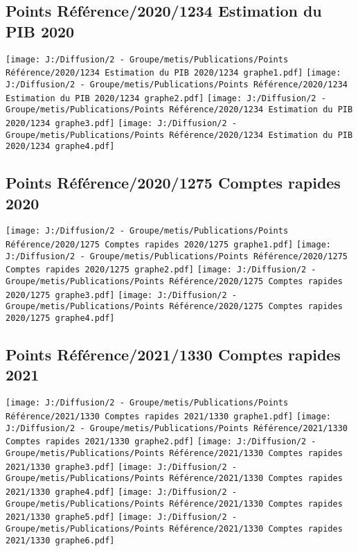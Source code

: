\documentclass[
]{article}
\begin{document}
\hypertarget{points-ruxe9fuxe9rence20201234-estimation-du-pib-2020}{%
\subsection{Points Référence/2020/1234 Estimation du PIB
2020}\label{points-ruxe9fuxe9rence20201234-estimation-du-pib-2020}}

\texttt{[image: J:/Diffusion/2 - Groupe/metis/Publications/Points Référence/2020/1234 Estimation du PIB 2020/1234 graphe1.pdf]}
\texttt{[image: J:/Diffusion/2 - Groupe/metis/Publications/Points Référence/2020/1234 Estimation du PIB 2020/1234 graphe2.pdf]}
\texttt{[image: J:/Diffusion/2 - Groupe/metis/Publications/Points Référence/2020/1234 Estimation du PIB 2020/1234 graphe3.pdf]}
\texttt{[image: J:/Diffusion/2 - Groupe/metis/Publications/Points Référence/2020/1234 Estimation du PIB 2020/1234 graphe4.pdf]}

\hypertarget{points-ruxe9fuxe9rence20201275-comptes-rapides-2020}{%
\subsection{Points Référence/2020/1275 Comptes rapides
2020}\label{points-ruxe9fuxe9rence20201275-comptes-rapides-2020}}

\texttt{[image: J:/Diffusion/2 - Groupe/metis/Publications/Points Référence/2020/1275 Comptes rapides 2020/1275 graphe1.pdf]}
\texttt{[image: J:/Diffusion/2 - Groupe/metis/Publications/Points Référence/2020/1275 Comptes rapides 2020/1275 graphe2.pdf]}
\texttt{[image: J:/Diffusion/2 - Groupe/metis/Publications/Points Référence/2020/1275 Comptes rapides 2020/1275 graphe3.pdf]}
\texttt{[image: J:/Diffusion/2 - Groupe/metis/Publications/Points Référence/2020/1275 Comptes rapides 2020/1275 graphe4.pdf]}

\hypertarget{points-ruxe9fuxe9rence20211330-comptes-rapides-2021}{%
\subsection{Points Référence/2021/1330 Comptes rapides
2021}\label{points-ruxe9fuxe9rence20211330-comptes-rapides-2021}}

\texttt{[image: J:/Diffusion/2 - Groupe/metis/Publications/Points Référence/2021/1330 Comptes rapides 2021/1330 graphe1.pdf]}
\texttt{[image: J:/Diffusion/2 - Groupe/metis/Publications/Points Référence/2021/1330 Comptes rapides 2021/1330 graphe2.pdf]}
\texttt{[image: J:/Diffusion/2 - Groupe/metis/Publications/Points Référence/2021/1330 Comptes rapides 2021/1330 graphe3.pdf]}
\texttt{[image: J:/Diffusion/2 - Groupe/metis/Publications/Points Référence/2021/1330 Comptes rapides 2021/1330 graphe4.pdf]}
\texttt{[image: J:/Diffusion/2 - Groupe/metis/Publications/Points Référence/2021/1330 Comptes rapides 2021/1330 graphe5.pdf]}
\texttt{[image: J:/Diffusion/2 - Groupe/metis/Publications/Points Référence/2021/1330 Comptes rapides 2021/1330 graphe6.pdf]}
\end{document}
